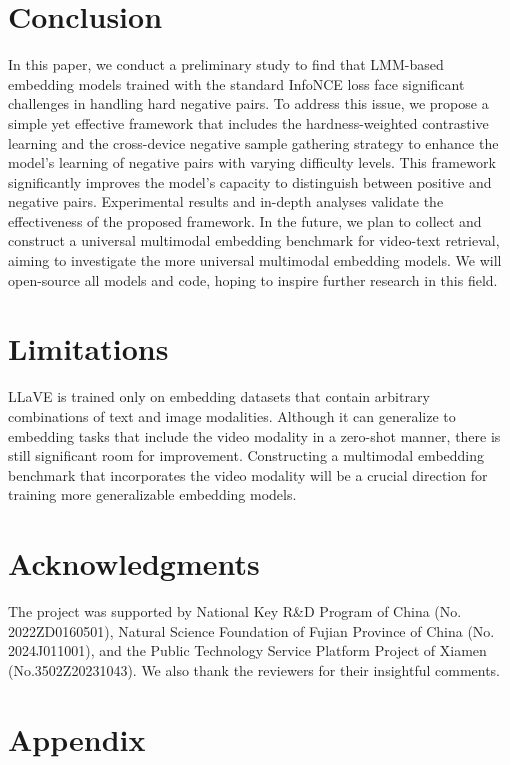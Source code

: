 \documentclass[11pt]{article}
\begin{document}
\section{Conclusion}
In this paper, we conduct a preliminary study to find that LMM-based embedding models trained with the standard InfoNCE loss face significant challenges in handling hard negative pairs. To address this issue, we propose a simple yet effective framework that includes the hardness-weighted contrastive learning and the cross-device negative sample gathering strategy to enhance the model's learning of negative pairs with varying difficulty levels. This framework significantly improves the model’s capacity to distinguish between positive and negative pairs. Experimental results and in-depth analyses validate the effectiveness of the proposed framework. In the future, we plan to collect and construct a universal multimodal embedding benchmark for video-text retrieval, aiming to investigate the more universal multimodal embedding models. We will open-source all models and code, hoping to inspire further research in this field.
\section*{Limitations}
LLaVE is trained only on embedding datasets that contain arbitrary combinations of text and image modalities. Although it can generalize to embedding tasks that include the video modality in a zero-shot manner, there is still significant room for improvement. Constructing a multimodal embedding benchmark that incorporates the video modality will be a crucial direction for training more generalizable embedding models.

\section*{Acknowledgments}
The project was supported by 
National Key R\&D Program of China (No. 2022ZD0160501), 
Natural Science Foundation of Fujian Province of China (No. 2024J011001),
and
the Public Technology Service Platform Project of Xiamen (No.3502Z20231043).
We also thank the reviewers for their insightful comments.

%


\newpage
\appendix
\section{Appendix}
\label{sec:appendix}
\end{document}
